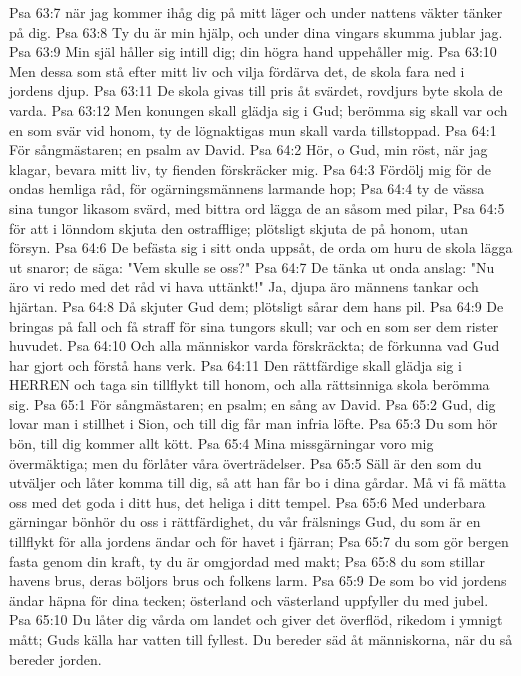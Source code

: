 Psa 63:7  när jag kommer ihåg dig på mitt läger och under nattens väkter tänker på dig.
Psa 63:8  Ty du är min hjälp, och under dina vingars skumma jublar jag.
Psa 63:9  Min själ håller sig intill dig; din högra hand uppehåller mig.
Psa 63:10  Men dessa som stå efter mitt liv och vilja fördärva det, de skola fara ned i jordens djup.
Psa 63:11  De skola givas till pris åt svärdet, rovdjurs byte skola de varda.
Psa 63:12  Men konungen skall glädja sig i Gud; berömma sig skall var och en som svär vid honom, ty de lögnaktigas mun skall varda tillstoppad.
Psa 64:1  För sångmästaren; en psalm av David.
Psa 64:2  Hör, o Gud, min röst, när jag klagar, bevara mitt liv, ty fienden förskräcker mig.
Psa 64:3  Fördölj mig för de ondas hemliga råd, för ogärningsmännens larmande hop;
Psa 64:4  ty de vässa sina tungor likasom svärd, med bittra ord lägga de an såsom med pilar,
Psa 64:5  för att i lönndom skjuta den ostrafflige; plötsligt skjuta de på honom, utan försyn.
Psa 64:6  De befästa sig i sitt onda uppsåt, de orda om huru de skola lägga ut snaror; de säga: "Vem skulle se oss?"
Psa 64:7  De tänka ut onda anslag: "Nu äro vi redo med det råd vi hava uttänkt!" Ja, djupa äro männens tankar och hjärtan.
Psa 64:8  Då skjuter Gud dem; plötsligt sårar dem hans pil.
Psa 64:9  De bringas på fall och få straff för sina tungors skull; var och en som ser dem rister huvudet.
Psa 64:10  Och alla människor varda förskräckta; de förkunna vad Gud har gjort och förstå hans verk.
Psa 64:11  Den rättfärdige skall glädja sig i HERREN och taga sin tillflykt till honom, och alla rättsinniga skola berömma sig.
Psa 65:1  För sångmästaren; en psalm; en sång av David.
Psa 65:2  Gud, dig lovar man i stillhet i Sion, och till dig får man infria löfte.
Psa 65:3  Du som hör bön, till dig kommer allt kött.
Psa 65:4  Mina missgärningar voro mig övermäktiga; men du förlåter våra överträdelser.
Psa 65:5  Säll är den som du utväljer och låter komma till dig, så att han får bo i dina gårdar. Må vi få mätta oss med det goda i ditt hus, det heliga i ditt tempel.
Psa 65:6  Med underbara gärningar bönhör du oss i rättfärdighet, du vår frälsnings Gud, du som är en tillflykt för alla jordens ändar och för havet i fjärran;
Psa 65:7  du som gör bergen fasta genom din kraft, ty du är omgjordad med makt;
Psa 65:8  du som stillar havens brus, deras böljors brus och folkens larm.
Psa 65:9  De som bo vid jordens ändar häpna för dina tecken; österland och västerland uppfyller du med jubel.
Psa 65:10  Du låter dig vårda om landet och giver det överflöd, rikedom i ymnigt mått; Guds källa har vatten till fyllest. Du bereder säd åt människorna, när du så bereder jorden.
